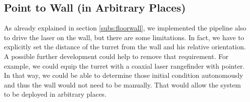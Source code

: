 \subsection{Point to Wall (in Arbitrary Places)}
As already explained in section \ref{subs:floorwall}, we implemented the pipeline also to drive the laser on the wall, but there are some limitations. In fact, we have to explicitly set the distance of the turret from the wall and his relative orientation. A possible further development could help to remove that requirement. For example, we could equip the turret with a coaxial laser rangefinder with pointer. In that way, we could be able to determine those initial condition autonomously and thus the wall would not need to be  manually. That would allow the system to be deployed in arbitrary places.